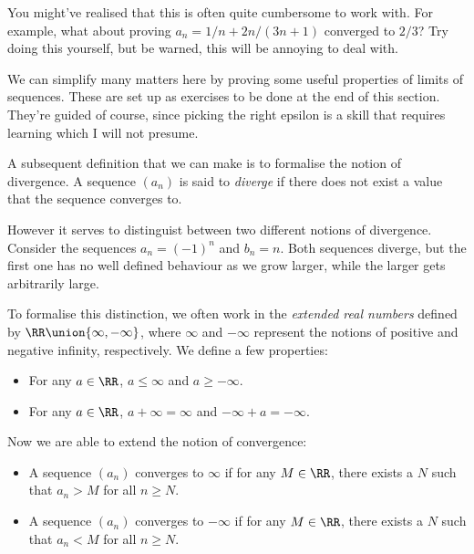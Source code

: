 You might've realised that this is often quite cumbersome to work with. For example,
what about proving $a_n = 1/n + 2n/(3n + 1)$ converged to $2/3$? Try doing this yourself,
but be warned, this will be annoying to deal with.

We can simplify many matters here by proving some useful properties of limits of
sequences. These are set up as exercises to be done at the end of this section. They're
guided of course, since picking the right epsilon is a skill that requires learning
which I will not presume.

\begin{remark}
    A subsequent definition that we can make is to formalise the notion of divergence. A
    sequence $(a_n)$ is said to \emph{diverge} if there does not exist a value that the sequence
    converges to.

    However it serves to distinguist between two different notions of divergence. Consider the
    sequences $a_n = (-1)^n$ and $b_n = n$. Both sequences diverge, but the first one
    has no well defined behaviour as we grow larger, while the larger gets arbitrarily large.

    To formalise this distinction, we often work in the \emph{extended real numbers} defined by
    $\RR \union \{\infty, -\infty\}$, where $\infty$ and $-\infty$
    represent the notions of positive and negative infinity, respectively. We define a few properties:

    \begin{itemize}
        \item For any $a \in \RR$, $a \leq \infty$ and $a \geq -\infty$.
        \item For any $a \in \RR$, $a + \infty = \infty$ and $- \infty + a = -\infty$.
    \end{itemize}

    Now we are able to extend the notion of convergence:

    \begin{itemize}
        \item A sequence $(a_n)$ converges to $\infty$ if for any $M \in \RR$, there exists a $N$ such that $a_n > M$ for all $n \geq N$.
        \item A sequence $(a_n)$ converges to $-\infty$ if for any $M \in \RR$, there exists a $N$ such that $a_n < M$ for all $n \geq N$.

    \end{itemize}
    \label{rem:extended_convergence}
\end{remark}

